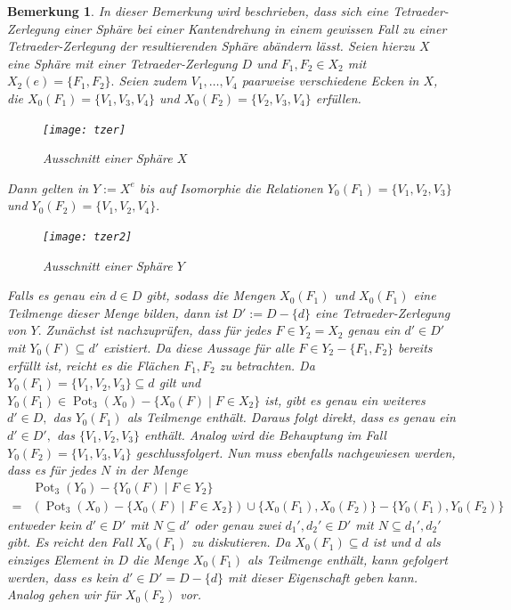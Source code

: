 \documentclass[12pt,titlepage,twoside,cleardoublepage]{article}
\theoremstyle{nummermitklammern}
\newtheorem{bemerkung}[temp]{Bemerkung}
\newtheorem{bemerkung}[zahl]{Bemerkung}
\numberwithin{equation}{section}
\DeclareMathOperator{\Pot}{Pot}
\begin{document}
\begin{bemerkung}\label{tzer}
In dieser Bemerkung wird beschrieben, dass sich eine Tetraeder-Zerlegung einer Sphäre bei einer Kantendrehung in einem gewissen Fall zu einer Tetraeder-Zerlegung der resultierenden Sphäre abändern lässt. Seien hierzu $X$ eine Sphäre mit einer Tetraeder-Zerlegung $D$ und $F_1,F_2\in X_2$  mit $X_2(e)=\{F_1,F_2\}.$ Seien zudem $V_1,\ldots,V_4$ paarweise verschiedene Ecken in $X$, die $X_0(F_1)=\{V_1,V_3,V_4\}$ und $X_0(F_2)=\{V_2,V_3,V_4\}$ erfüllen.
 \begin{figure}[H]
\begin{center}
\texttt{[image: tzer]}
\end{center}
\caption{Ausschnitt einer Sphäre $X$}
\end{figure}
 
 Dann gelten in $Y:=X^e$ bis auf Isomorphie die Relationen ${Y}_0(F_1)=\{V_1,V_2,V_3\}$ und ${Y}_0(F_2)=\{V_1,V_2,V_4\}.$
 \begin{figure}[H]
\begin{center}
\texttt{[image: tzer2]}
\end{center}
\caption{Ausschnitt einer Sphäre $Y$}
\end{figure}
Falls es genau ein $d\in D$ gibt, sodass die Mengen ${X}_0(F_1)$ und ${X}_0(F_1)$ eine Teilmenge dieser Menge bilden, dann ist $D':=D-\{d\}$ eine Tetraeder-Zerlegung von $Y.$ Zunächst ist nachzuprüfen, dass für jedes $F\in {Y}_2=X_2$ genau ein $d'\in D'$ mit ${Y}_0(F)\subseteq d'$ existiert. Da diese Aussage für alle $F\in Y_2-\{ F_1,F_2\}$ bereits erfüllt ist, reicht es die Flächen $F_1,F_2$ zu betrachten. Da ${Y}_0(F_1)=\{V_1,V_2,V_3\}\subseteq d$  gilt und  $Y_0(F_1) \in \Pot_3(X_0)-\{X_0(F)\mid F\in X_2\}$ ist, gibt es genau ein weiteres $d'\in D,$ das ${Y}_0(F_1)$ als Teilmenge enthält. Daraus folgt direkt, dass es genau ein $d'\in D',$ das $\{V_1,V_2,V_3\}$ enthält. Analog wird die Behauptung im Fall ${Y}_0(F_2)=\{V_1,V_3,V_4\}$ geschlussfolgert.
Nun muss ebenfalls nachgewiesen werden, dass es für jedes $N$ in der Menge 
\begin{align*}
 &\Pot_3({Y}_0)-\{{Y}_0(F)\mid F\in {Y}_2\}\\
 =& (\Pot_3({X}_0)-\{{X}_0(F)\mid F\in {X}_2\})\cup \{X_0(F_1),X_0(F_2)\}-\{{Y}_0(F_1),{Y}_0(F_2)\}
 \end{align*}
  entweder kein $d'\in D'$ mit $N\subseteq d'$ 
  oder genau zwei $d_1',d_2'\in D'$ mit $N\subseteq d_1',d_2'$ gibt. 
  Es reicht den Fall $X_0(F_1)$ zu diskutieren. Da $X_0(F_1)\subseteq d$ ist und $d$ als einziges Element in $D$ die Menge $X_0(F_1)$ als Teilmenge enthält, kann gefolgert werden, dass es kein $d'\in D'=D-\{d\}$ mit dieser Eigenschaft geben kann. Analog gehen wir für $X_0(F_2) $ vor.
\end{bemerkung}
\end{document}
